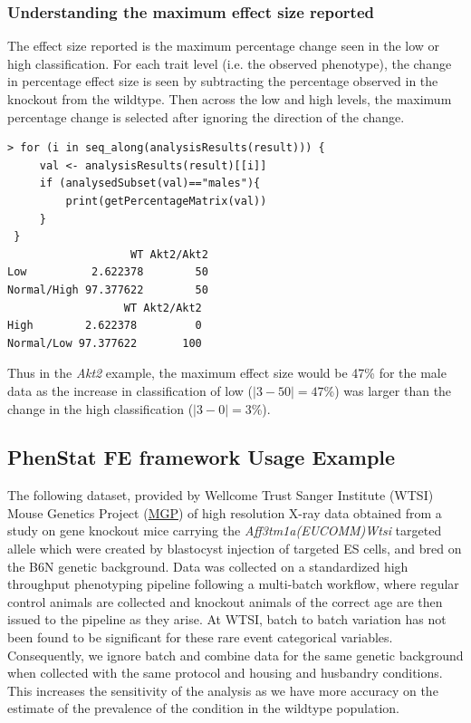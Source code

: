 \documentclass[12pt,a4paper]{article}
\begin{document}
\subsubsection{Understanding the maximum effect size reported}
The effect size reported is the maximum percentage change seen in the low or high classification. For each trait level (i.e. the observed phenotype), the change in percentage effect size is seen by subtracting the percentage observed in the knockout from the wildtype. Then across the low and high levels, the maximum percentage change is selected after ignoring the direction of the change. 
\begingroup
    \fontsize{8pt}{12pt}\selectfont
\begin{verbatim}
> for (i in seq_along(analysisResults(result))) {
     val <- analysisResults(result)[[i]]
     if (analysedSubset(val)=="males"){
         print(getPercentageMatrix(val))               
     }
 }
                   WT Akt2/Akt2
Low          2.622378        50
Normal/High 97.377622        50
                  WT Akt2/Akt2
High        2.622378         0
Normal/Low 97.377622       100
\end{verbatim}
\endgroup 

Thus in the \textit{Akt2} example, the maximum effect size would be 47\% for the male data as the increase in classification of low ($|3-50|=47$\%) was larger than the change in the high classification ($|3-0|=3$\%). 

\subsection{PhenStat FE framework Usage Example}
The following dataset, provided by Wellcome Trust Sanger Institute (WTSI) Mouse Genetics Project (\href{http://www.sanger.ac.uk/resources/mouse/}{MGP}) of high resolution X-ray data obtained from 
a study on gene knockout mice carrying the \textit{Aff3tm1a(EUCOMM)Wtsi} targeted allele which were created by blastocyst injection of targeted ES cells, and bred on the B6N genetic background. 
Data was collected on a standardized high throughput phenotyping pipeline following a multi-batch workflow, where regular control animals are collected and knockout animals of the correct age are then issued to the pipeline as they arise. 
At WTSI, batch to batch variation has not been found to be significant for these rare event categorical variables. 
Consequently, we ignore batch and combine data for the same genetic background when collected with the same protocol and housing and husbandry conditions. 
This increases the sensitivity of the analysis as we have more accuracy on the estimate of the prevalence of the condition in the wildtype population.
\end{document}
